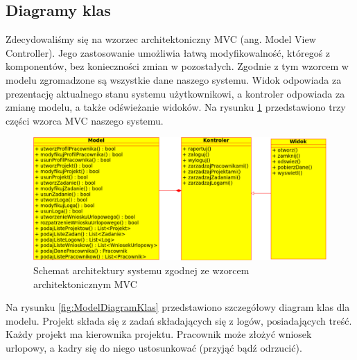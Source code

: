 \subsection{Diagramy klas}

Zdecydowaliśmy się na wzorzec architektoniczny MVC (ang. Model View Controller). 
Jego zastosowanie umożliwia łatwą modyfikowalność, któregoś z komponentów, bez                                                                                               
konieczności zmian w pozostałych. Zgodnie z tym wzorcem w modelu zgromadzone są wszystkie dane naszego systemu. 
Widok odpowiada za prezentację aktualnego stanu systemu użytkownikowi, a kontroler odpowiada za zmianę modelu, a także odświeżanie widoków.
Na rysunku \ref{fig:mvc} przedstawiono trzy części wzorca MVC naszego systemu.

\begin{figure}[h]
    \centering
    \includegraphics[scale=0.5]{diagramy/modelKlas/mvc.pdf}
    \caption{Schemat architektury systemu zgodnej ze wzorcem architektonicznym MVC}
    \label{fig:mvc}
\end{figure}

Na rysunku \ref{fig:ModelDiagramKlas} przedstawiono szczegółowy diagram klas dla modelu. Projekt składa się z zadań składających się z logów, posiadających
treść. Każdy projekt ma kierownika projektu. Pracownik może złożyć wniosek urlopowy, a kadry się do niego ustosunkować (przyjąć bądź odrzucić).

